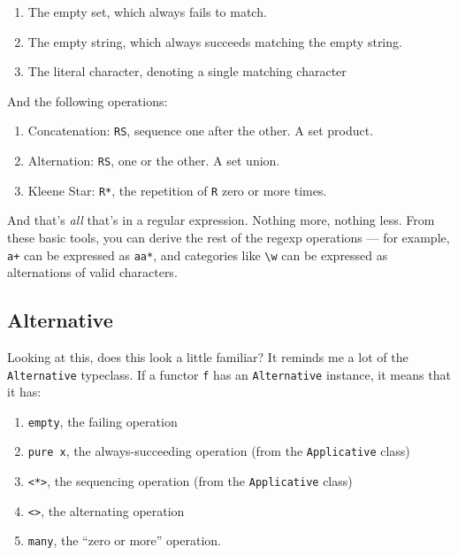 \documentclass[]{article}
\begin{document}
\begin{enumerate}
\def\labelenumi{\arabic{enumi}.}
\tightlist
\item
  The empty set, which always fails to match.
\item
  The empty string, which always succeeds matching the empty string.
\item
  The literal character, denoting a single matching character
\end{enumerate}

And the following operations:

\begin{enumerate}
\def\labelenumi{\arabic{enumi}.}
\tightlist
\item
  Concatenation: \texttt{RS}, sequence one after the other. A set product.
\item
  Alternation: \texttt{R\textbar{}S}, one or the other. A set union.
\item
  Kleene Star: \texttt{R*}, the repetition of \texttt{R} zero or more times.
\end{enumerate}

And that's \emph{all} that's in a regular expression. Nothing more, nothing
less. From these basic tools, you can derive the rest of the regexp operations
--- for example, \texttt{a+} can be expressed as \texttt{aa*}, and categories
like \texttt{\textbackslash{}w} can be expressed as alternations of valid
characters.

\hypertarget{alternative}{%
\subsection{Alternative}\label{alternative}}

Looking at this, does this look a little familiar? It reminds me a lot of the
\texttt{Alternative} typeclass. If a functor \texttt{f} has an
\texttt{Alternative} instance, it means that it has:

\begin{enumerate}
\def\labelenumi{\arabic{enumi}.}
\tightlist
\item
  \texttt{empty}, the failing operation
\item
  \texttt{pure\ x}, the always-succeeding operation (from the
  \texttt{Applicative} class)
\item
  \texttt{\textless{}*\textgreater{}}, the sequencing operation (from the
  \texttt{Applicative} class)
\item
  \texttt{\textless{}\textbar{}\textgreater{}}, the alternating operation
\item
  \texttt{many}, the ``zero or more'' operation.
\end{enumerate}
\end{document}
